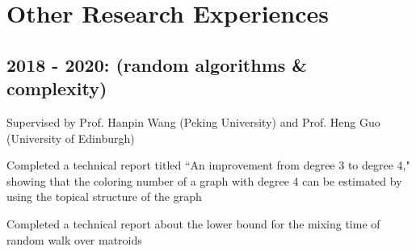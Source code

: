\documentclass[letterpaper]{article}
\renewenvironment{itemize}{
  \begin{list}{}{
    \setlength{\leftmargin}{1.5em}
  }
}{
  \end{list}
}
\begin{document}

    
%

\section*{Other Research Experiences}
    
    \subsection*{2018 - 2020: (random algorithms \& complexity)}
    \begin{itemize}
        \item Supervised by Prof. Hanpin Wang (Peking University) and Prof. Heng Guo (University of Edinburgh)
        \item  Completed a technical report titled  ``An improvement from degree 3 to degree 4,"
               showing that the coloring number of a graph with degree 4 can be estimated by using the topical structure of the graph
        \item Completed a technical report about the lower bound for the mixing time of random walk over matroids
    \end{itemize}
    
\end{document}
